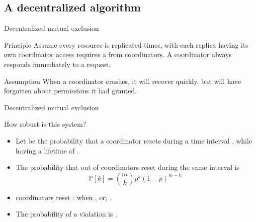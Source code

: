 \subsection{A decentralized algorithm}
\begin{slide}{Decentralized mutual exclusion}
  \begin{block}{Principle}
    Assume every resource is replicated  times, with each replica having its own coordinator
    \mathexpr{\Rightarrow} access requires a  from  coordinators. A
    coordinator always responds immediately to a request.
  \end{block}
  \begin{block}{Assumption} 
    When a coordinator crashes, it will recover quickly, but will have forgotten about permissions it had
    granted.
  \end{block}
\end{slide}
\begin{slide}{Decentralized mutual exclusion}
  \begin{block}{How robust is this system?}
    \begin{itemize}
    \item Let  be the probability that a coordinator resets during a time interval
      , while having a lifetime of .
    \item The probability  that
     out of  coordinators reset during the same interval is
    \[
    \mathbb{P}[k] = \binom{m}{k} p^k (1 - p)^{m-k}
    \]
    \item {} coordinators reset \mathexpr{\Rightarrow} : when , or, .
    \item The probability of a violation is .
    \end{itemize}
  \end{block}
\end{slide}
